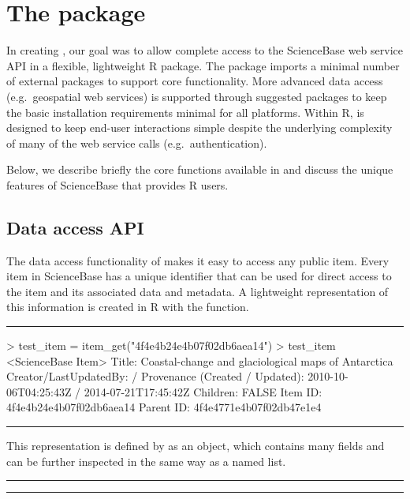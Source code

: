 
\section{The  package}

In creating , our goal was to allow complete
access to the ScienceBase web service API in a flexible, lightweight
R package. The package imports a minimal number of external packages
to support core functionality. More advanced data access (e.g.\ geospatial
web services) is supported through suggested packages to keep the basic
installation requirements minimal for all platforms. Within R, 
is designed to keep end-user interactions simple despite the underlying 
complexity of many of the web service calls (e.g.\ authentication).

Below, we describe briefly the core functions available in 
and discuss the unique features of ScienceBase that 
provides R users.


\subsection{Data access API}
The data access functionality of  makes it easy to
access any public item. Every item in ScienceBase has a unique identifier
that can be used for direct access to the item and its associated data and
metadata. A lightweight representation of this information is created in R
with the  function.

\noindent\rule{\textwidth}{0.4pt}
\begin{example}
> test_item = item_get("4f4e4b24e4b07f02db6aea14")
> test_item
<ScienceBase Item>
  Title: Coastal-change and glaciological maps of Antarctica
  Creator/LastUpdatedBy:      /
  Provenance (Created / Updated):  2010-10-06T04:25:43Z / 2014-07-21T17:45:42Z
  Children: FALSE
  Item ID: 4f4e4b24e4b07f02db6aea14
  Parent ID: 4f4e4771e4b07f02db47e1e4
\end{example}
\noindent\rule{\textwidth}{0.4pt}

This representation is defined by  as an  object,
which contains many fields and can be further inspected in the same
way as a named list.

\noindent\rule{\textwidth}{0.4pt}
\noindent\rule{\textwidth}{0.4pt}

